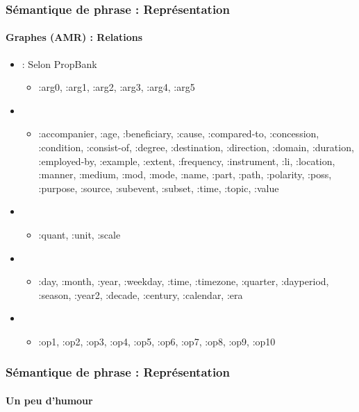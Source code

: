 \documentclass[xcolor=table]{beamer}
\begin{document}
\begin{frame}[fragile]
	\frametitle{Sémantique de phrase : Représentation}
	\framesubtitle{Graphes (AMR) : Relations}
	
	\begin{itemize}
		\item {} : Selon PropBank
		\begin{itemize}
			\item :arg0, :arg1, :arg2, :arg3, :arg4, :arg5
		\end{itemize}
		\item {}
		\begin{itemize}
			\item :accompanier, :age, :beneficiary, :cause, :compared-to, :concession, :condition, :consist-of, :degree, :destination, :direction, :domain, :duration, :employed-by, :example, :extent, :frequency, :instrument, :li, :location, :manner, :medium, :mod, :mode, :name, :part, :path, :polarity, :poss, :purpose, :source, :subevent, :subset, :time, :topic, :value
		\end{itemize}
		\item {}
		\begin{itemize}
			\item :quant, :unit, :scale
		\end{itemize}
		\item {}
		\begin{itemize}
			\item :day, :month,
			:year, :weekday, :time, :timezone, :quarter,
			:dayperiod, :season, :year2, :decade, :century,
			:calendar, :era
		\end{itemize}
		\item {}
		\begin{itemize}
			\item :op1, :op2, :op3, :op4, :op5,
			:op6, :op7, :op8, :op9, :op10
		\end{itemize}
	\end{itemize}
	
\end{frame}

\begin{frame}
	\frametitle{Sémantique de phrase : Représentation}
	\framesubtitle{Un peu d'humour}
	
	\begin{center}
	\end{center}
	
\end{frame}

\end{document}
